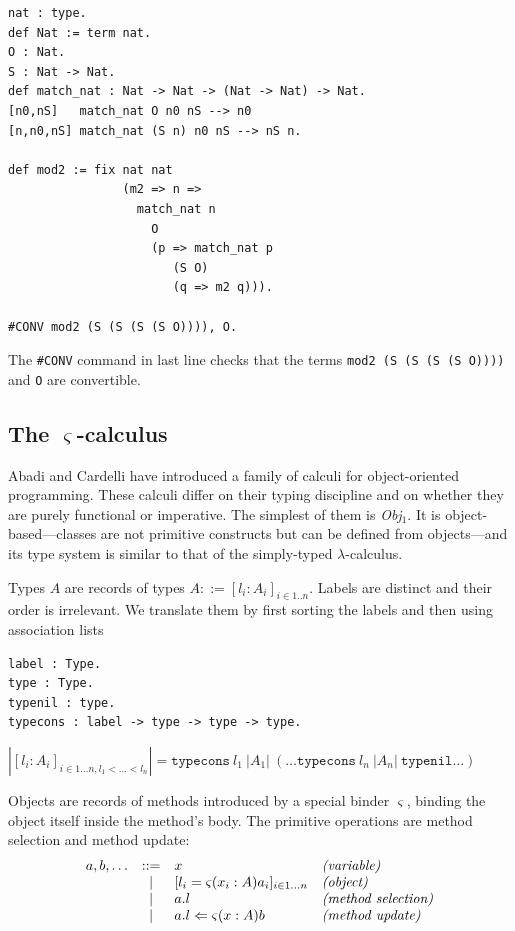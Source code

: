 \documentclass[english]{lipics}
\begin{document}
\begin{lstlisting}
nat : type.
def Nat := term nat.
O : Nat.
S : Nat -> Nat.
def match_nat : Nat -> Nat -> (Nat -> Nat) -> Nat.
[n0,nS]   match_nat O n0 nS --> n0
[n,n0,nS] match_nat (S n) n0 nS --> nS n.

def mod2 := fix nat nat
                (m2 => n =>
                  match_nat n
                    O
                    (p => match_nat p
                       (S O)
                       (q => m2 q))).

#CONV mod2 (S (S (S (S O)))), O.
\end{lstlisting}

The \lstinline{#CONV} command in last line checks that the terms
\lstinline{mod2 (S (S (S (S O))))} and \lstinline{O} are convertible.

\subsection{The $\varsigma$-calculus}

Abadi and Cardelli \cite{AbadiCardelli} have introduced a family of calculi
for object-oriented programming. These calculi differ on their typing
discipline and on whether they are purely functional or
imperative. The simplest of them is \textit{Obj}$_1$. It is
object-based---classes are not primitive
constructs but can be defined from objects---and its type system is
similar to that of the simply-typed $\lambda$-calculus.

Types $A$ are records of types $A ::= [l_i : A_i]_{i \in 1..n}$. Labels
are distinct and their order is irrelevant. We translate them
by first sorting the labels and then using association lists

\begin{lstlisting}
label : Type.
type : Type.
typenil : type.
typecons : label -> type -> type -> type.
\end{lstlisting}

\medskip

\(|[l_i : A_i]_{i \in 1\ldots n, l_1 < \ldots < l_n}| = \texttt{typecons}~l_1~|A_1|~(\ldots \texttt{typecons}~l_n~|A_n|~\texttt{typenil} \ldots)\)

\medskip

Objects are records of methods introduced by a special binder
$\varsigma$, binding the object itself inside the method's body. The
primitive operations are method selection and method update:
$$\begin{array}{lcll}
  a, b, \ldots & ::= & x & \emph{(variable)}\\
  & \vert & [l_i=\varsigma(x_i : A) a_i]_{i \in 1 \ldots n} & \emph{(object)}\\
  & \vert & a.l & \emph{(method selection)}\\
  & \vert & a.l \Leftarrow \varsigma(x : A) b & \emph{(method update)}\\
\end{array}$$
\end{document}
